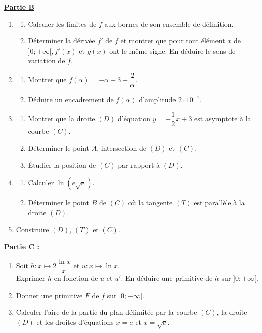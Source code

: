 \documentclass[12pt,a4paper]{article}
\begin{document}
\noindent \underline{\textbf{Partie B}}
\begin{enumerate}
    \item 
    \begin{enumerate}
        \item Calculer les limites de $f$ aux bornes de son ensemble de définition.
        \item Déterminer la dérivée $f'$ de $f$ et montrer que pour tout élément $x$ de $]0; +\infty[, f'(x)$ et $g(x)$ ont le même signe. En déduire le sens de variation de $f$.
    \end{enumerate}
    \item 
    \begin{enumerate}
        \item Montrer que $f(\alpha) = -\alpha + 3 + \dfrac{2}{\alpha}$.
        \item Déduire un encadrement de $f(\alpha)$ d'amplitude $2 \cdot 10^{-1}$.
    \end{enumerate}
    \item 
    \begin{enumerate}
        \item Montrer que la droite $(D)$ d'équation $y = -\dfrac{1}{2}x + 3$ est asymptote à la courbe $(C)$.
        \item Déterminer le point $A$, intersection de $(D)$ et $(C)$.
        \item Étudier la position de $(C)$ par rapport à $(D)$.
    \end{enumerate}
    \item 
    \begin{enumerate}
        \item Calculer $\ln(e\sqrt{e})$.
        \item Déterminer le point $B$ de $(C)$ où la tangente $(T)$ est parallèle à la droite $(D)$.
    \end{enumerate}
    \item Construire $(D)$, $(T)$ et $(C)$.
\end{enumerate}

\vspace{0.5cm}

\noindent \underline{\textbf{Partie C :}}
\begin{enumerate}
    \item Soit $h : x \mapsto 2\dfrac{\ln x}{x}$ et $u : x \mapsto \ln x$. \\
    Exprimer $h$ en fonction de $u$ et $u'$. En déduire une primitive de $h$ sur $]0; +\infty[$.
    \item Donner une primitive $F$ de $f$ sur $]0; +\infty[$.
    \item Calculer l'aire de la partie du plan délimitée par la courbe $(C)$, la droite $(D)$ et les droites d'équations $x = e$ et $x = \sqrt{e}$.
\end{enumerate}
\end{document}
